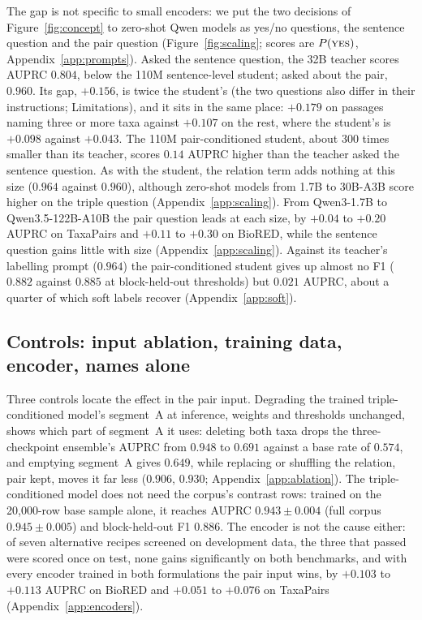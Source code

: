 \documentclass[11pt]{article}
\newcommand{\bench}{\mbox{TaxaPairs}}
\begin{document}
The gap is not specific to small encoders: we put the two decisions of Figure~\ref{fig:concept} to zero-shot Qwen models as
yes/no questions, the sentence question and the pair question (Figure~\ref{fig:scaling}; scores are
$P(\textsc{yes})$, Appendix~\ref{app:prompts}). Asked the
sentence question, the 32B teacher scores AUPRC $0.804$, below the 110M sentence-level
student; asked about the pair, $0.960$. Its gap, $+0.156$, is twice the student's (the two questions also differ in their instructions; Limitations), and it sits in
the same place: $+0.179$ on passages naming three or more taxa against $+0.107$ on the rest, where
the student's is $+0.098$ against $+0.043$. The 110M pair-conditioned student, about 300 times smaller than its teacher, scores $0.14$ AUPRC higher than the teacher asked the sentence question. As with the student, the
relation term adds nothing at this size ($0.964$ against $0.960$), although zero-shot models from
1.7B to 30B-A3B score higher on the triple question (Appendix~\ref{app:scaling}). From Qwen3-1.7B to Qwen3.5-122B-A10B \citep{qwen2026qwen35} the pair question leads at each size, by $+0.04$ to $+0.20$ AUPRC on
\bench{} and $+0.11$ to $+0.30$ on BioRED, while the sentence question gains little with size (Appendix~\ref{app:scaling}). Against its
teacher's labelling prompt ($0.964$) the pair-conditioned student gives up almost no F1 ($0.882$ against
$0.885$ at block-held-out thresholds) but $0.021$ AUPRC, about a quarter of which soft labels
recover (Appendix~\ref{app:soft}).

\subsection{Controls: input ablation, training data, encoder, names alone}
\label{sec:res-ablation}

Three controls locate the effect in the pair input. Degrading the trained triple-conditioned model's
segment~A at inference, weights and thresholds unchanged, shows which part of segment~A it uses: deleting both taxa
drops the three-checkpoint ensemble's AUPRC from $0.948$ to $0.691$ against a base rate of $0.574$, and emptying segment~A gives
$0.649$, while replacing or shuffling the relation, pair kept, moves it far less ($0.906$, $0.930$;
Appendix~\ref{app:ablation}). The triple-conditioned model does not need the corpus's contrast rows: trained
on the 20{,}000-row base sample alone, it reaches AUPRC $0.943 \pm 0.004$ (full corpus
$0.945 \pm 0.005$) and block-held-out F1 $0.886$. The encoder is not the cause either: of seven alternative recipes
screened on development data, the three that passed were scored once on test, none gains significantly on both
benchmarks, and with every encoder trained in both formulations the pair input wins, by $+0.103$ to $+0.113$ AUPRC on BioRED and
$+0.051$ to $+0.076$ on \bench{} (Appendix~\ref{app:encoders}).
\end{document}
